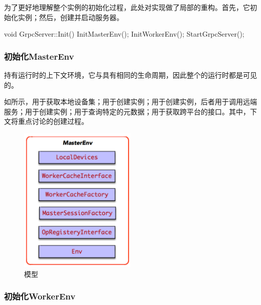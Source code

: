 \begin{content}
为了更好地理解整个实例的初始化过程，此处对实现做了局部的重构。首先，它初始化实例；然后，创建并启动服务器。

\begin{leftbar}
\begin{c++}
void GrpcServer::Init() {
  InitMasterEnv();
  InitWorkerEnv();
  StartGrpcServer();
}
\end{c++}
\end{leftbar}

\subsubsection{初始化MasterEnv}

持有运行时的上下文环境，它与具有相同的生命周期，因此整个的运行时都是可见的。

如所示，用于获取本地设备集；用于创建实例；用于创建实例，后者用于调用远端服务；用于创建实例；用于查询特定的元数据；用于获取跨平台的接口。其中，下文将重点讨论的创建过程。

\begin{figure}[H]
\centering
\includegraphics[width=0.5\textwidth]{figures/dist-master-env.png}
\caption{模型}
 \label{fig:dist-master-env}
\end{figure}

\subsubsection{初始化WorkerEnv}


\end{content}

